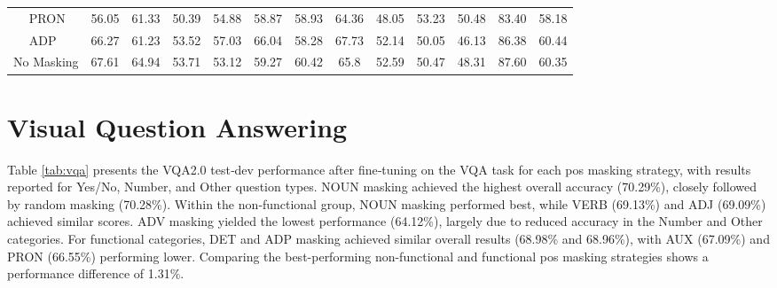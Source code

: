 \begin{table}[H]
\begin{adjustbox}{width=1\textwidth}
\begin{tabular}{ll|c|c|ccc|c|cc|cc|c|c}
            & PRON & 56.05 & 61.33 & 50.39 & 54.88 & 58.87 & 58.93 & 64.36 & 48.05 & \cellcolor{gray}53.23 & \cellcolor{lightgray}50.48 & 83.40 & 58.18 \\
            & ADP & \cellcolor{lightgray}66.27 & 61.23 & 53.52 & 57.03 & 66.04 & 58.28 & 67.73 & \cellcolor{gray}52.14 & 50.05 & 46.13 & \cellcolor{lightgray}86.38 & \cellcolor{lightgray}60.44 \\
            \hline
            \multicolumn{2}{c|}{No Masking} & 67.61 & 64.94 & 53.71 & 53.12 & 59.27 & 60.42 & 65.8 & 52.59 & 50.47 & 48.31 & 87.60 & 60.35 \\
            \hline
        \end{tabular}
    \end{adjustbox}
\end{table}

\section{Visual Question Answering}
Table \ref{tab:vqa} presents the VQA2.0 test‐dev performance after fine‐tuning on the VQA task for each \acrshort{pos} masking strategy, with results reported for Yes/No, Number, and Other question types.
NOUN masking achieved the highest overall accuracy (70.29\%), closely followed by random masking (70.28\%).
Within the non‐functional group, NOUN masking performed best, while VERB (69.13\%) and ADJ (69.09\%) achieved similar scores. ADV masking yielded the lowest performance (64.12\%), largely due to reduced accuracy in the Number and Other categories.
For functional categories, DET and ADP masking achieved similar overall results (68.98\% and 68.96\%), with AUX (67.09\%) and PRON (66.55\%) performing lower.
Comparing the best-performing non-functional and functional \acrshort{pos} masking strategies shows a performance difference of 1.31\%.

